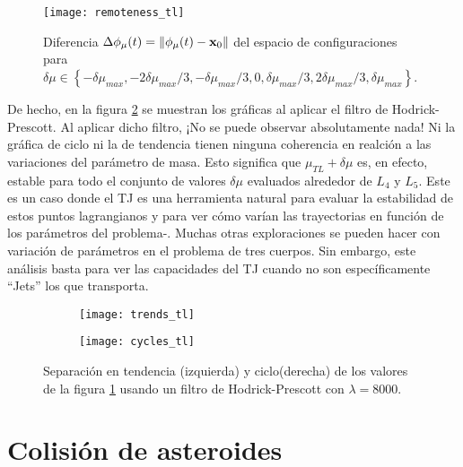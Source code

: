 \begin{figure}
 \centering
 \texttt{[image: remoteness\_tl]}
 \caption{Diferencia $\Delta\phi_\mu(t) = \left\lVert \phi_\mu(t) - \mathbf{x}_0 \right\rVert$ del espacio de configuraciones para $\delta\mu \in \left\lbrace -\delta\mu_{max}, -2\delta\mu_{max}/3, -\delta\mu_{max}/3, 0, \delta\mu_{max}/3, 2\delta\mu_{max}/3, \delta\mu_{max}  \right\rbrace$.}
 \label{fig:remoteness_tl}
\end{figure}

De hecho, en la figura \ref{fig:trendcycle_tl} se muestran los gráficas al aplicar el filtro de Hodrick-Prescott. Al aplicar dicho filtro, ¡No se puede observar absolutamente nada! Ni la gráfica de ciclo ni la de tendencia tienen ninguna coherencia en realción a las variaciones del parámetro de masa. Esto significa que $\mu_{TL} + \delta\mu$ es, en efecto, estable para todo el conjunto de valores $\delta\mu$ evaluados alrededor de $L_4$ y $L_5$. Este es un caso donde el TJ es una herramienta natural para evaluar la estabilidad de estos puntos lagrangianos y para ver cómo varían las trayectorias en función de los parámetros del problema-. Muchas otras exploraciones se pueden hacer con variación de parámetros en el problema de tres cuerpos. Sin embargo, este análisis basta para ver las capacidades del TJ cuando no son específicamente ``Jets'' los que transporta.

\begin{figure}[h!]
\centering
\begin{subfigure}{0.49\textwidth}
	\centering
	\texttt{[image: trends\_tl]}
\end{subfigure}
%
\begin{subfigure}{0.49\textwidth}
	\centering
	\texttt{[image: cycles\_tl]}
\end{subfigure}
\caption{ Separación en tendencia (izquierda) y ciclo(derecha) de los valores de la figura \ref{fig:remoteness_tl} usando un filtro de Hodrick-Prescott con $\lambda = 8000$.}
\label{fig:trendcycle_tl}
\end{figure}

\pagebreak
\section{Colisión de asteroides}
\label{sec:asteroids}



